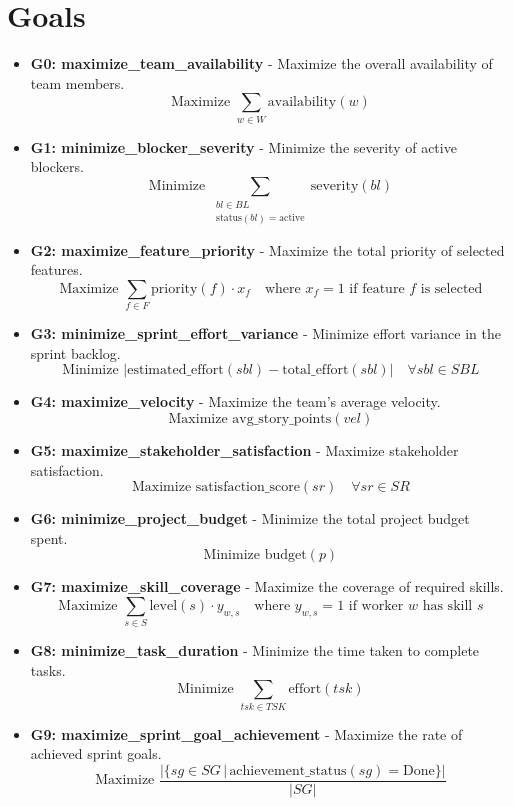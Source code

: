 \documentclass[11pt]{article}
\begin{document}
\section{Goals}
\begin{itemize}
    \item \textbf{G0: maximize\_team\_availability} - Maximize the overall availability of team members.
        \[ \text{Maximize } \sum_{w \in W} \text{availability}(w) \]
    \item \textbf{G1: minimize\_blocker\_severity} - Minimize the severity of active blockers.
        \[ \text{Minimize } \sum_{\substack{bl \in BL \\ \text{status}(bl) = \text{active}}} \text{severity}(bl) \]
    \item \textbf{G2: maximize\_feature\_priority} - Maximize the total priority of selected features.
        \[ \text{Maximize } \sum_{f \in F} \text{priority}(f) \cdot x_f \quad \text{where } x_f = 1 \text{ if feature } f \text{ is selected} \]
    \item \textbf{G3: minimize\_sprint\_effort\_variance} - Minimize effort variance in the sprint backlog.
        \[ \text{Minimize } \left| \text{estimated\_effort}(sbl) - \text{total\_effort}(sbl) \right| \quad \forall sbl \in SBL \]
    \item \textbf{G4: maximize\_velocity} - Maximize the team's average velocity.
        \[ \text{Maximize } \text{avg\_story\_points}(vel) \]
    \item \textbf{G5: maximize\_stakeholder\_satisfaction} - Maximize stakeholder satisfaction.
        \[ \text{Maximize } \text{satisfaction\_score}(sr) \quad \forall sr \in SR \]
    \item \textbf{G6: minimize\_project\_budget} - Minimize the total project budget spent.
        \[ \text{Minimize } \text{budget}(p) \]
    \item \textbf{G7: maximize\_skill\_coverage} - Maximize the coverage of required skills.
        \[ \text{Maximize } \sum_{s \in S} \text{level}(s) \cdot y_{w,s} \quad \text{where } y_{w,s} = 1 \text{ if worker } w \text{ has skill } s \]
    \item \textbf{G8: minimize\_task\_duration} - Minimize the time taken to complete tasks.
        \[ \text{Minimize } \sum_{tsk \in TSK} \text{effort}(tsk) \]
    \item \textbf{G9: maximize\_sprint\_goal\_achievement} - Maximize the rate of achieved sprint goals.
        \[ \text{Maximize } \frac{ |\{ sg \in SG \, | \, \text{achievement\_status}(sg) = \text{Done} \} | }{ |SG| } \]
\end{itemize}
\end{document}
